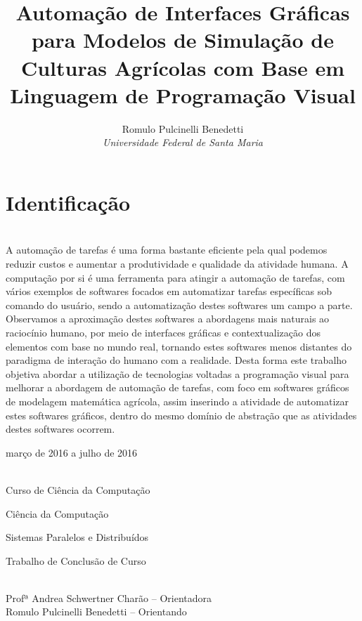 \documentclass[12pt]{article}
\title{Automação de Interfaces Gráficas para Modelos de Simulação de Culturas Agrícolas com Base em Linguagem de Programação Visual}
\author{Romulo Pulcinelli Benedetti \\ \emph{Universidade Federal de Santa Maria}}
\begin{document}
	\maketitle

	\section{Identificação}

    	\begin{description} \itemsep 0pt
    		\item[Resumo:] ~\\

        	A automação de tarefas é uma forma bastante eficiente pela qual podemos reduzir custos e aumentar a produtividade e qualidade da atividade humana. A computação por si é uma ferramenta para atingir a automação de tarefas, com vários exemplos de softwares focados em automatizar tarefas específicas sob comando do usuário, sendo a automatização destes softwares um campo a parte. Observamos a aproximação destes softwares a abordagens mais naturais ao raciocínio humano, por meio de interfaces gráficas e contextualização dos elementos com base no mundo real, tornando estes softwares menos distantes do paradigma de interação do humano com a realidade. Desta forma este trabalho objetiva abordar a utilização de tecnologias voltadas a programação visual para melhorar a abordagem de automação de tarefas, com foco em softwares gráficos de modelagem matemática agrícola, assim inserindo a atividade de automatizar estes softwares gráficos, dentro do mesmo domínio de abstração que as atividades destes softwares ocorrem.

    		\item[Período de execução:] março de 2016 a julho de 2016
    		\item[Unidades participantes:] ~\\ Curso de Ciência da Computação
    		\item[Área de conhecimento:] Ciência da Computação
    		\item[Linha de Pesquisa:] Sistemas Paralelos e Distribuídos
    		\item[Tipo de projeto:] Trabalho de Conclusão de Curso
    		\item[Participantes:] ~\\ Profª Andrea Schwertner Charão -- Orientadora \\ Romulo Pulcinelli Benedetti -- Orientando
    	\end{description}
\end{document}
